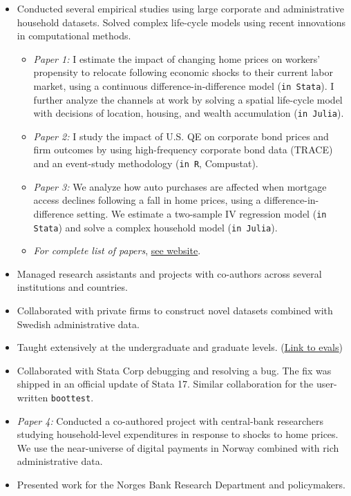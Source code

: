 \documentclass{clean_CV}
\begin{document}
\begin{itemize}
    \item Conducted several empirical studies using large corporate and administrative household datasets. Solved complex life-cycle models using recent innovations in computational methods.
    \begin{itemize}
        \item \textit{Paper 1:} I estimate the impact of changing home prices on workers' propensity to relocate following economic shocks to their current labor market, using a continuous difference-in-difference model (\texttt{in Stata}). I further analyze the channels at work by solving a spatial life-cycle model with decisions of location, housing, and wealth accumulation (\texttt{in Julia}).
        \item \textit{Paper 2:} I study the impact of U.S. QE on corporate bond prices and firm outcomes by using high-frequency corporate bond data (TRACE) and an event-study methodology (\texttt{in R}, Compustat).
        \item \textit{Paper 3:} We analyze how auto purchases are affected when mortgage access declines following a fall in home prices, using a difference-in-difference setting. We estimate a two-sample IV regression model (\texttt{in Stata}) and solve a complex household model (\texttt{in Julia}).
        \item \textit{For complete list of papers}, \uline{\href{https://www.jesperbojeryd.se/research}{see website}}.
    \end{itemize}
    \item Managed research assistants and projects with co-authors across several institutions and countries.
    \item Collaborated with private firms to construct novel datasets combined with Swedish administrative data.
    \item Taught extensively at the undergraduate and graduate levels. \quad (\uline{\href{https://www.jesperbojeryd.se/teaching}{Link to evals}})
    \item Collaborated with Stata Corp debugging and resolving a bug. The fix was shipped in an official update of Stata 17. Similar collaboration for the user-written \texttt{boottest}.
\end{itemize}


\medskip

\begin{itemize}
    \item \textit{Paper 4:} Conducted a co-authored project with central-bank researchers studying household-level expenditures in response to shocks to home prices. We use the near-universe of digital payments in Norway combined with rich administrative data.
    \item Presented work for the Norges Bank Research Department and policymakers.
\end{itemize}
\end{document}
